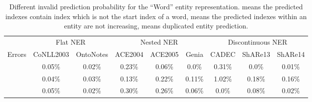 \documentclass[11pt,a4paper]{article}
\begin{document}
\begin{table*}[!bht]
  \centering
  \setlength{\tabcolsep}{2pt}  \renewcommand{\arraystretch}{1.2}
  \begin{tabular}{c|c|c|c|c|c|c|c|c}
\toprule
         & \multicolumn{2}{c|}{Flat NER} & \multicolumn{3}{c|}{Nested NER} & \multicolumn{3}{c}{Discontinuous NER} \\
    \cline{2-9}
  Errors & CoNLL2003     & OntoNotes    & ACE2004   & ACE2005   & Genia  & CADEC     & ShARe13     & ShARe14     \\
\hline
       & 0.05\%        & 0.02\%       & 0.23\%    & 0.06\%   & 0.0\%   & 0.31\%     & 0.0\%       & 0.01\%     \\  \hline

       & 0.04\%        & 0.03\%       & 0.13\%    & 0.22\%   & 0.11\%  & 1.02\%     & 0.18\%      & 0.16\%     \\  \hline
       & 0.05\%        & 0.02\%       & 0.30\%    & 0.26\%   & 0.06\%  & 0.0\%      & 0.08\%      & 0.02\%   \\
\bottomrule
  \end{tabular}
  \caption{Different invalid prediction probability for the ``Word'' entity representation.  means the predicted indexes contain index which is not the start index of a word,  means the predicted indexes within an entity are not increasing,  means duplicated entity prediction.  }
  \label{tb:invalid}
\end{table*}
\end{document}
